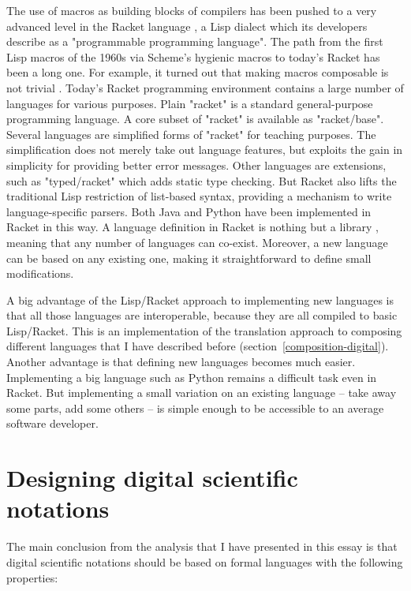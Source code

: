 The use of macros as building blocks of compilers has been pushed to a very advanced level in the Racket language \cite{plt-tr1}, a Lisp dialect which its developers describe as a "programmable programming language". The path from the first Lisp macros of the 1960s via Scheme's hygienic macros to today's Racket has been a long one. For example, it turned out that making macros composable is not trivial \cite{flatt_composable_2002}. Today's Racket programming environment contains a large number of languages for various purposes. Plain "racket" is a standard general-purpose programming language. A core subset of "racket" is available as "racket/base". Several languages are simplified forms of "racket" for teaching purposes. The simplification does not merely take out language features, but exploits the gain in simplicity for providing better error messages. Other languages are extensions, such as "typed/racket" which adds static type checking. But Racket also lifts the traditional Lisp restriction of list-based syntax, providing a mechanism to write language-specific parsers. Both Java and Python have been implemented in Racket in this way. A language definition in Racket is nothing but a library \cite{tobin-hochstadt_languages_2011}, meaning that any number of languages can co-exist. Moreover, a new language can be based on any existing one, making it straightforward to define small modifications.

A big advantage of the Lisp/Racket approach to implementing new languages is that all those languages are interoperable, because they are all compiled to basic Lisp/Racket. This is an implementation of the translation approach to composing different languages that I have described before (section~\ref{composition-digital}). Another advantage is that defining new languages becomes much easier. Implementing a big language such as Python remains a difficult task even in Racket. But implementing a small variation on an existing language -- take away some parts, add some others -- is simple enough to be accessible to an average software developer.

\section{Designing digital scientific notations}
\label{design-guidelines}

The main conclusion from the analysis that I have presented in this essay is that digital scientific notations should be based on formal languages with the following properties:

